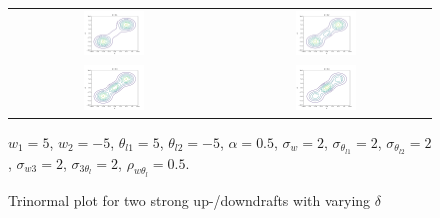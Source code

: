 \documentclass[10pt]{beamer}
\numberwithin{equation}{section}
\begin{document}
    \begin{frame}
        \begin{figure}[!htb]
            \centering
            \begin{tabular}{cc}
                \multicolumn{1}{c}{\includegraphics[width=0.3\textwidth]{include/figures/plot3_1}} &
                \multicolumn{1}{c}{\includegraphics[width=0.3\textwidth]{include/figures/plot3_2}} \\
                \multicolumn{1}{c}{\includegraphics[width=0.3\textwidth]{include/figures/plot3_3}} &
                \multicolumn{1}{c}{\includegraphics[width=0.3\textwidth]{include/figures/plot3_4}} \\
            \end{tabular}
            \caption{Trinormal plot for two strong up-/downdrafts with varying $\delta$}
            \label{fig:plot3}
            $w_1 = 5$, $w_2 = -5$, $\theta_{l1} = 5$, $\theta_{l2} = -5$,
            $\alpha = 0.5$, $\sigma_w = 2$, $\sigma_{\theta_{l1}} = 2$,  $\sigma_{\theta_{l2}} = 2$,
            $\sigma_{w3} = 2$, $\sigma_{3\theta_l} = 2$, $\rho_{w\theta_l} = 0.5$.
        \end{figure}
    \end{frame}
\end{document}
